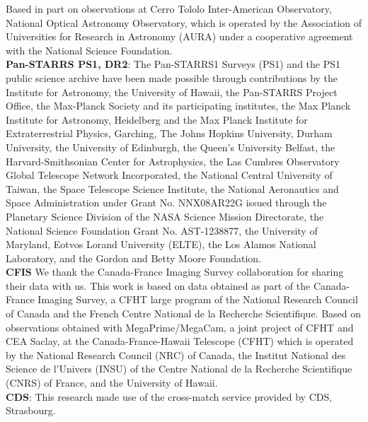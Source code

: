 \documentclass[fleqn,usenatbib]{mnras}
\begin{document}
Based in part on observations at Cerro Tololo Inter-American Observatory, National Optical Astronomy Observatory, which is operated by the Association of Universities for Research in Astronomy (AURA) under a cooperative agreement with the National Science Foundation.\\
{\bf Pan-STARRS PS1, DR2}: The Pan-STARRS1 Surveys (PS1) and the PS1 public science archive have been made possible through contributions by the Institute for Astronomy, the University of Hawaii, the Pan-STARRS Project Office, the Max-Planck Society and its participating institutes, the Max Planck Institute for Astronomy, Heidelberg and the Max Planck Institute for Extraterrestrial Physics, Garching, The Johns Hopkins University, Durham University, the University of Edinburgh, the Queen's University Belfast, the Harvard-Smithsonian Center for Astrophysics, the Las Cumbres Observatory Global Telescope Network Incorporated, the National Central University of Taiwan, the Space Telescope Science Institute, the National Aeronautics and Space Administration under Grant No. NNX08AR22G issued through the Planetary Science Division of the NASA Science Mission Directorate, the National Science Foundation Grant No. AST-1238877, the University of Maryland, Eotvos Lorand University (ELTE), the Los Alamos National Laboratory, and the Gordon and Betty Moore Foundation.\\
{\bf CFIS} We thank the Canada-France Imaging Survey collaboration for sharing their data with us. This work is based on data obtained as part of the Canada-France Imaging Survey, a CFHT large program of the National Research Council of Canada and the French Centre National de la Recherche Scientifique. Based on observations obtained with MegaPrime/MegaCam, a joint project of CFHT and CEA Saclay, at the Canada-France-Hawaii Telescope (CFHT) which is operated by the National Research Council (NRC) of Canada, the Institut National des Science de l'Univers (INSU) of the Centre National de la Recherche Scientifique (CNRS) of France, and the University of Hawaii.\\
{\bf CDS}:  This research made use of the cross-match service provided by CDS, Strasbourg.

\end{document}
